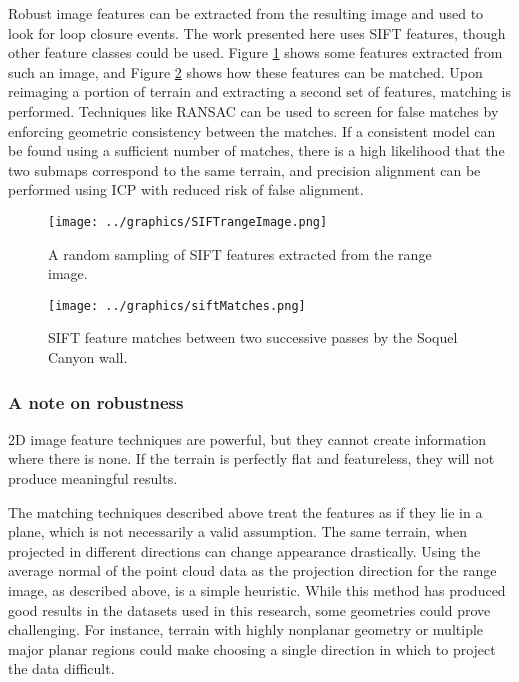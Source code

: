 Robust image features can be extracted from the resulting image and used to look for loop closure events. The work presented here uses SIFT features, though other feature classes could be used. Figure \ref{fig:SIFTrangeImage} shows some features extracted from such an image, and Figure \ref{fig:matches} shows how these features can be matched. Upon reimaging a portion of terrain and extracting a second set of features, matching is performed. Techniques like RANSAC can be used to screen for false matches by enforcing geometric consistency between the matches. If a consistent model can be found using a sufficient number of matches, there is a high likelihood that the two submaps correspond to the same terrain, and precision alignment can be performed using ICP with reduced risk of false alignment. 

\begin{figure}[htb]
   \centering
   \texttt{[image: ../graphics/SIFTrangeImage.png]} %
   \caption{A random sampling of SIFT features extracted from the range image.}
   \label{fig:SIFTrangeImage}
\end{figure}

\begin{figure}[htb]
   \centering
   \texttt{[image: ../graphics/siftMatches.png]} %
   \caption{SIFT feature matches between two successive passes by the Soquel Canyon wall. }
   \label{fig:matches}
\end{figure}

\subsubsection{A note on robustness}

2D image feature techniques are powerful, but they cannot create information where there is none. If the terrain is perfectly flat and featureless, they will not produce meaningful results. 

The matching techniques described above treat the features as if they lie in a plane, which is not necessarily a valid assumption. The same terrain, when projected in different directions can change appearance drastically. Using the average normal of the point cloud data as the projection direction for the range image, as described above, is a simple heuristic. While this method has produced good results in the datasets used in this research, some geometries could prove challenging. For instance, terrain with highly nonplanar geometry or multiple major planar regions could make choosing a single direction in which to project the data difficult.  

